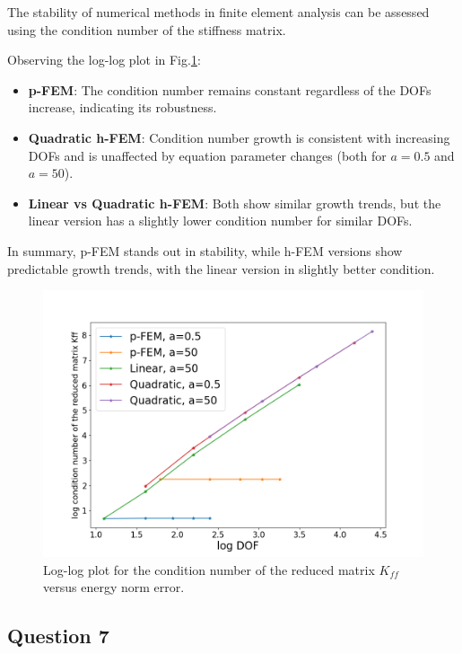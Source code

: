 \documentclass[twoside,twocolumn,10pt]{article}
\begin{document}
The stability of numerical methods in finite element analysis can be assessed using the condition number of the stiffness matrix.

Observing the log-log plot in Fig.\ref{fig:contK}:
\begin{itemize}
    \item \textbf{p-FEM}: The condition number remains constant regardless of the DOFs increase, indicating its robustness.
    
    \item \textbf{Quadratic h-FEM}: Condition number growth is consistent with increasing DOFs and is unaffected by equation parameter changes (both for \(a=0.5\) and \(a=50\)).
    
    \item \textbf{Linear vs Quadratic h-FEM}: Both show similar growth trends, but the linear version has a slightly lower condition number for similar DOFs.
\end{itemize}

In summary, p-FEM stands out in stability, while h-FEM versions show predictable growth trends, with the linear version in slightly better condition.



\begin{figure}[!ht]
  \centering
  \includegraphics[width=1.\linewidth]{Q1/cont_K.png}
  \caption{Log-log plot for the condition number of the reduced matrix $K_{ff}$ versus energy norm error.}
  \label{fig:contK}
\end{figure}

\subsection{Question 7}
\end{document}
